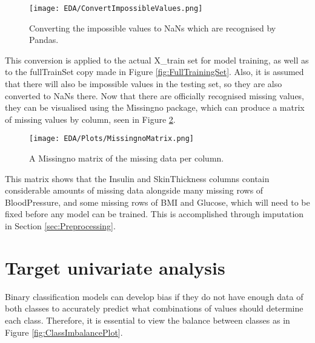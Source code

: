 \begin{figure}[H]
    \centering
    \texttt{[image: EDA/ConvertImpossibleValues.png]} 
    \caption{Converting the impossible values to NaNs which are recognised by Pandas.}
    \label{fig:ConvertImpossibleValues}
\end{figure}

\para This conversion is applied to the actual X\_train set for model training, as well as to the fullTrainSet copy made in Figure \ref{fig:FullTrainingSet}.
Also, it is assumed that there will also be impossible values in the testing set, so they are also converted to NaNs there.
Now that there are officially recognised missing values, they can be visualised using the Missingno package, which can produce a 
matrix of missing values by column, seen in Figure \ref{fig:MissingnoMatrix}.

\begin{figure}[H]
    \centering
    \texttt{[image: EDA/Plots/MissingnoMatrix.png]}
    \caption{A Missingno matrix of the missing data per column.}
    \label{fig:MissingnoMatrix}
\end{figure}


\para This matrix shows that the Insulin and SkinThickness columns contain considerable amounts of missing data alongside
many missing rows of BloodPressure, and some missing rows of BMI and Glucose, 
which will need to be fixed before any model can be trained. This is accomplished through imputation in Section 
\ref{sec:Preprocessing}.


\pagebreak 


\section{Target univariate analysis}\label{ASec:Imbalance}
Binary classification models can develop bias if they do not have enough data of both classes to accurately predict what combinations 
of values should determine each class. Therefore, it is essential to view the balance between classes as in Figure \ref{fig:ClassImbalancePlot}.

